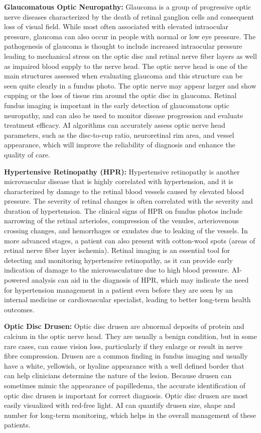 \documentclass[
  Letterpaper,
]{scrbook}
\begin{document}
\textbf{Glaucomatous Optic Neuropathy:} Glaucoma is a group of
progressive optic nerve diseases characterized by the death of retinal
ganglion cells and consequent loss of visual field. While most often
associated with elevated intraocular pressure, glaucoma can also occur
in people with normal or low eye pressure. The pathogenesis of glaucoma
is thought to include increased intraocular pressure leading to
mechanical stress on the optic disc and retinal nerve fiber layers as
well as impaired blood supply to the nerve head. The optic nerve head is
one of the main structures assessed when evaluating glaucoma and this
structure can be seen quite clearly in a fundus photo. The optic nerve
may appear larger and show cupping or the loss of tissue rim around the
optic disc in glaucoma. Retinal fundus imaging is important in the early
detection of glaucomatous optic neuropathy, and can also be used to
monitor disease progression and evaluate treatment efficacy. AI
algorithms can accurately assess optic nerve head parameters, such as
the disc-to-cup ratio, neuroretinal rim area, and vessel appearance,
which will improve the reliability of diagnosis and enhance the quality
of care.

\textbf{Hypertensive Retinopathy (HPR):} Hypertensive retinopathy is
another microvascular disease that is highly correlated with
hypertension, and it is characterized by damage to the retinal blood
vessels caused by elevated blood pressure. The severity of retinal
changes is often correlated with the severity and duration of
hypertension. The clinical signs of HPR on fundus photos include
narrowing of the retinal arterioles, compression of the venules,
arteriovenous crossing changes, and hemorrhages or exudates due to
leaking of the vessels. In more advanced stages, a patient can also
present with cotton-wool spots (areas of retinal nerve fiber layer
ischemia). Retinal imaging is an essential tool for detecting and
monitoring hypertensive retinopathy, as it can provide early indication
of damage to the microvasculature due to high blood pressure. AI-powered
analysis can aid in the diagnosis of HPR, which may indicate the need
for hypertension management in a patient even before they are seen by an
internal medicine or cardiovascular specialist, leading to better
long-term health outcomes.

\textbf{Optic Disc Drusen:} Optic disc drusen are abnormal deposits of
protein and calcium in the optic nerve head. They are usually a benign
condition, but in some rare cases, can cause vision loss, particularly
if they enlarge or result in nerve fibre compression. Drusen are a
common finding in fundus imaging and usually have a white, yellowish, or
hyaline appearance with a well defined border that can help clinicians
determine the nature of the lesion. Because drusen can sometimes mimic
the appearance of papilledema, the accurate identification of optic disc
drusen is important for correct diagnosis. Optic disc drusen are most
easily visualized with red-free light. AI can quantify drusen size,
shape and number for long-term monitoring, which helps in the overall
management of these patients.
\end{document}
